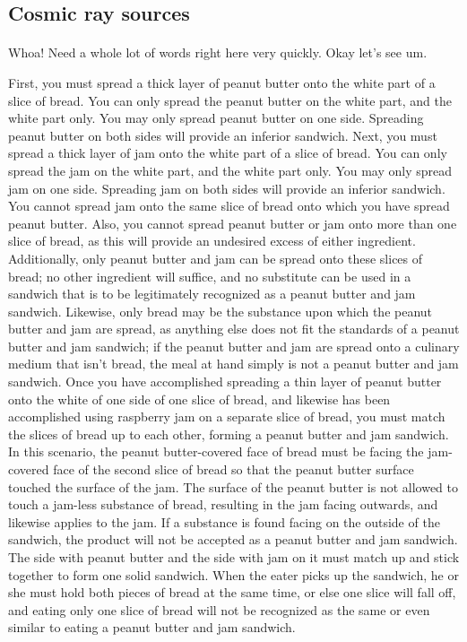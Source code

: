 \documentclass[a4paper, titlepage, oneside]{article}
\begin{document}
\begin{multicols}{2}
\subsection{Cosmic ray sources}
\paragraph{}
Whoa! Need a whole lot of words right here very quickly. Okay let's see um.

First, you must spread a thick layer of peanut butter onto the white part of a slice of bread. You can only spread the peanut butter on the white part, and the white part only. You may only spread peanut butter on one side. Spreading peanut butter on both sides will provide an inferior sandwich. Next, you must spread a thick layer of jam onto the white part of a slice of bread. You can only spread the jam on the white part, and the white part only. You may only spread jam on one side. Spreading jam on both sides will provide an inferior sandwich. You cannot spread jam onto the same slice of bread onto which you have spread peanut butter. Also, you cannot spread peanut butter or jam onto more than one slice of bread, as this will provide an undesired excess of either ingredient. Additionally, only peanut butter and jam can be spread onto these slices of bread; no other ingredient will suffice, and no substitute can be used in a sandwich that is to be legitimately recognized as a peanut butter and jam sandwich. Likewise, only bread may be the substance upon which the peanut butter and jam are spread, as anything else does not fit the standards of a peanut butter and jam sandwich; if the peanut butter and jam are spread onto a culinary medium that isn’t bread, the meal at hand simply is not a peanut butter and jam sandwich. Once you have accomplished spreading a thin layer of peanut butter onto the white of one side of one slice of bread, and likewise has been accomplished using raspberry jam on a separate slice of bread, you must match the slices of bread up to each other, forming a peanut butter and jam sandwich. In this scenario, the peanut butter-covered face of bread must be facing the jam-covered face of the second slice of bread so that the peanut butter surface touched the surface of the jam. The surface of the peanut butter is not allowed to touch a jam-less substance of bread, resulting in the jam facing outwards, and likewise applies to the jam. If a substance is found facing on the outside of the sandwich, the product will not be accepted as a peanut butter and jam sandwich. The side with peanut butter and the side with jam on it must match up and stick together to form one solid sandwich. When the eater picks up the sandwich, he or she must hold both pieces of bread at the same time, or else one slice will fall off, and eating only one slice of bread will not be recognized as the same or even similar to eating a peanut butter and jam sandwich.


\end{multicols}
\end{document}
